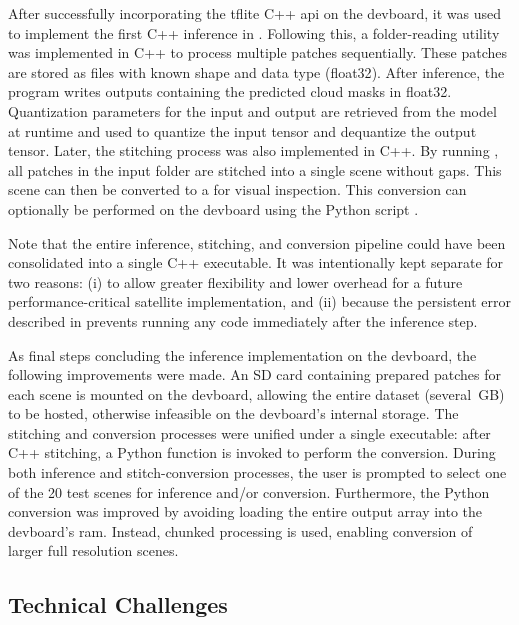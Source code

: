 {After successfully incorporating the \gls{tflite} C++ \gls{api} on the \gls{devboard},
it was used to implement the first C++ inference in .
Following this, a folder-reading utility was implemented in C++ to process multiple patches sequentially.
These patches are stored as  files with known shape and data type (\gls{float32}).
After inference, the program writes  outputs containing the predicted cloud masks in \gls{float32}.
Quantization parameters for the input and output are retrieved from the model at runtime and used to quantize the input tensor and dequantize the output tensor.
Later, the stitching process was also implemented in C++.
By running , all  patches in the input folder are stitched into a single  scene without gaps.
This  scene can then be converted to a  for visual inspection.
This conversion can optionally be performed on the \gls{devboard} using the Python script .

Note that the entire inference, stitching, and conversion pipeline could have been consolidated into a single C++ executable.
It was intentionally kept separate for two reasons:
(i) to allow greater flexibility and lower overhead for a future performance-critical satellite implementation, and
(ii) because the persistent error described in  prevents running any code immediately after the inference step.

As final steps concluding the inference implementation on the \gls{devboard}, the following improvements were made.
An SD card containing prepared  patches for each scene is mounted on the \gls{devboard},
allowing the entire dataset (several~GB) to be hosted, otherwise infeasible on the \gls{devboard}'s internal storage.
The stitching and conversion processes were unified under a single executable: after C++  stitching, a Python function is invoked to perform the conversion.
During both inference and stitch-conversion processes, the user is prompted to select one of the 20 test scenes for inference and/or conversion.
Furthermore, the Python  conversion was improved by avoiding loading the entire output array into the \gls{devboard}'s \gls{ram}.
Instead, chunked processing is used, enabling conversion of larger full resolution scenes.

\subsection*{Technical Challenges}
\label{subsec:tecchallDeployment}

}
